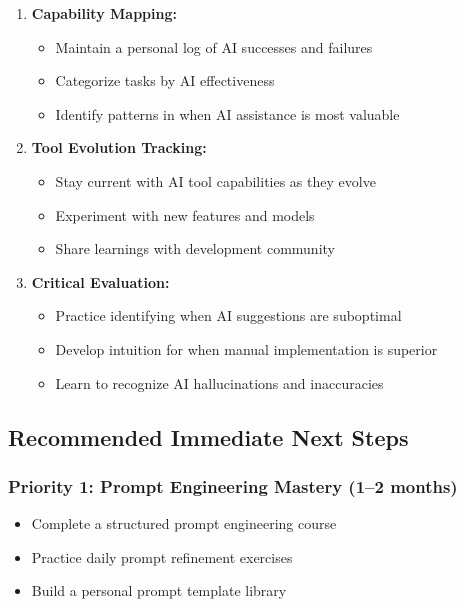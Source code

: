 \documentclass[12pt,a4paper]{article}
\begin{document}
\begin{enumerate}
    \item \textbf{Capability Mapping:}
    \begin{itemize}
        \item Maintain a personal log of AI successes and failures
        \item Categorize tasks by AI effectiveness
        \item Identify patterns in when AI assistance is most valuable
    \end{itemize}
    
    \item \textbf{Tool Evolution Tracking:}
    \begin{itemize}
        \item Stay current with AI tool capabilities as they evolve
        \item Experiment with new features and models
        \item Share learnings with development community
    \end{itemize}
    
    \item \textbf{Critical Evaluation:}
    \begin{itemize}
        \item Practice identifying when AI suggestions are suboptimal
        \item Develop intuition for when manual implementation is superior
        \item Learn to recognize AI hallucinations and inaccuracies
    \end{itemize}
\end{enumerate}

\subsection{Recommended Immediate Next Steps}

\subsubsection*{Priority 1: Prompt Engineering Mastery (1--2 months)}
\begin{itemize}
    \item Complete a structured prompt engineering course
    \item Practice daily prompt refinement exercises
    \item Build a personal prompt template library
\end{itemize}
\end{document}
